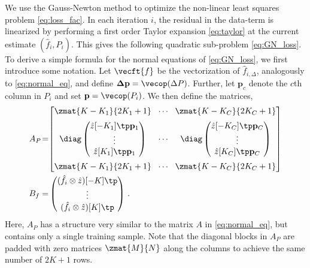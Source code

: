 \documentclass[10pt,twocolumn,letterpaper]{article}
\begin{document}
We use the Gauss-Newton method \cite{NumericalOptimization} to optimize the non-linear least squares problem \eqref{eq:loss_fac}. In each iteration $i$, the residual in the data-term is linearized by performing a first order Taylor expansion \eqref{eq:taylor} at the current estimate $(\hat{f}_i, P_i)$. This gives the following quadratic sub-problem \eqref{eq:GN_loss}.
To derive a simple formula for the normal equations of \eqref{eq:GN_loss}, we first introduce some notation. Let $\vecft{f}$ be the vectorization of $\hat{f}_{i,\Delta}$, analogously to \eqref{eq:normal_eq}, and define $\mathbf{\Delta p} = \vecop(\Delta P)$. Further, let $\mathbf{p}_c$ denote the $c$th column in $P_i$ and set $\mathbf{p} = \vecop(P_i)$. We then define the matrices,
\begin{align}
	\label{eq:notation}
	A_P \!=& \! \begin{bmatrix}
		\zmat{K-K_1}{2K_1+1} & \!\cdots\! & \zmat{K-K_C}{2K_C+1} \vspace{2mm}\\
		\diag \begin{pmatrix} \hat{z}[-K_1]\tp \mathbf{p}_1 \\ \vdots \\ \hat{z}[K_1]\tp \mathbf{p}_1 \end{pmatrix} &
		\!\cdots\! &
		\diag \begin{pmatrix} \hat{z}[-K_C]\tp \mathbf{p}_C \\ \vdots \\ \hat{z}[K_C]\tp \mathbf{p}_C \end{pmatrix} \vspace{2mm}\\
		\zmat{K-K_1}{2K_1+1} & \!\cdots\! & \zmat{K-K_C}{2K_C+1}
	\end{bmatrix}
	\nonumber \\
	B_f =& \begin{pmatrix}
		(\hat{f}_i \otimes \hat{z})[-K]\tp \\ \vdots \\ (\hat{f}_i \otimes \hat{z})[K]\tp
	\end{pmatrix}
	\, .
\end{align}
Here, $A_P$ has a structure very similar to the matrix $A$ in \eqref{eq:normal_eq}, but contains only a single training sample. Note that the diagonal blocks in $A_P$ are padded with zero matrices $\zmat{M}{N}$ along the columns to achieve the same number of $2K+1$ rows.
\end{document}
